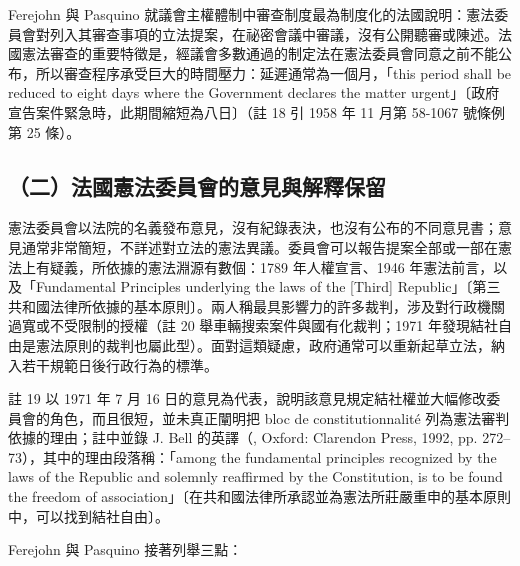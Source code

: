 Ferejohn 與 Pasquino 就議會主權體制中審查制度最為制度化的法國說明：憲法委員會對列入其審查事項的立法提案，在祕密會議中審議，沒有公開聽審或陳述。法國憲法審查的重要特徵是，經議會多數通過的制定法在憲法委員會同意之前不能公布，所以審查程序承受巨大的時間壓力：延遲通常為一個月，「this period shall be reduced to eight days where the Government declares the matter urgent」〔政府宣告案件緊急時，此期間縮短為八日〕（註 18 引 1958 年 11 月第 58-1067 號條例第 25 條）。

\subsection{（二）法國憲法委員會的意見與解釋保留}

憲法委員會以法院的名義發布意見，沒有紀錄表決，也沒有公布的不同意見書；意見通常非常簡短，不詳述對立法的憲法異議。委員會可以報告提案全部或一部在憲法上有疑義，所依據的憲法淵源有數個：1789 年人權宣言、1946 年憲法前言，以及「Fundamental Principles underlying the laws of the {[}Third{]} Republic」〔第三共和國法律所依據的基本原則〕。兩人稱最具影響力的許多裁判，涉及對行政機關過寬或不受限制的授權（註 20 舉車輛搜索案件與國有化裁判；1971 年發現結社自由是憲法原則的裁判也屬此型）。面對這類疑慮，政府通常可以重新起草立法，納入若干規範日後行政行為的標準。

註 19 以 1971 年 7 月 16 日的意見為代表，說明該意見規定結社權並大幅修改委員會的角色，而且很短，並未真正闡明把 bloc de constitutionnalité 列為憲法審判依據的理由；註中並錄 J. Bell 的英譯（, Oxford: Clarendon Press, 1992, pp. 272--73），其中的理由段落稱：「among the fundamental principles recognized by the laws of the Republic and solemnly reaffirmed by the Constitution, is to be found the freedom of association」〔在共和國法律所承認並為憲法所莊嚴重申的基本原則中，可以找到結社自由〕。

Ferejohn 與 Pasquino 接著列舉三點：

